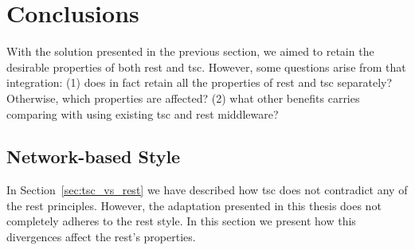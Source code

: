 \section{Conclusions}

With the solution presented in the previous section, we aimed to retain the desirable properties of both \ac{rest} and \ac{tsc}.
However, some questions arise from that integration:
(1) does in fact retain all the properties of \ac{rest} and \ac{tsc} separately? Otherwise, which properties are affected?
(2) what other benefits carries comparing with using existing \ac{tsc} and \ac{rest} middleware?



\subsection{Network-based Style} %
\label{sec:network_properties}

In Section~\ref{sec:tsc_vs_rest} we have described how \ac{tsc} does not contradict any of the \ac{rest} principles.
However, the adaptation presented in this thesis does not completely adheres to the \ac{rest} style.
In this section we present how this divergences affect the \ac{rest}'s properties.



